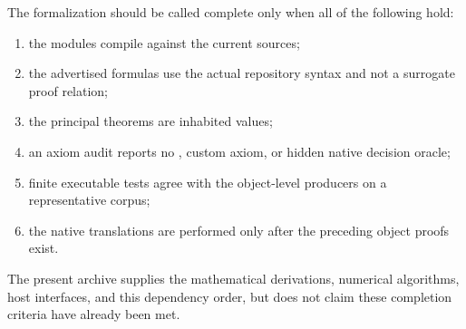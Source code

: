 The formalization should be called complete only when all of the following hold:
\begin{enumerate}[label=\arabic*.]
\item the modules compile against the current  sources;
\item the advertised formulas use the actual repository syntax and not a surrogate proof relation;
\item the principal theorems are inhabited  values;
\item an axiom audit reports no , custom axiom, or hidden native decision oracle;
\item finite executable tests agree with the object-level producers on a representative corpus;
\item the native translations are performed only after the preceding object proofs exist.
\end{enumerate}
The present archive supplies the mathematical derivations, numerical algorithms, host interfaces,
and this dependency order, but does not claim these completion criteria have already been met.
